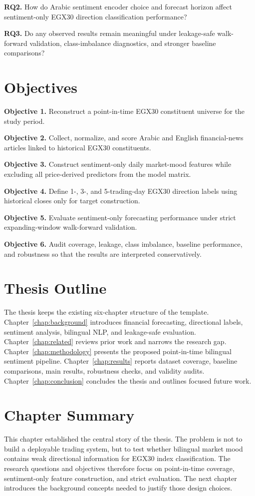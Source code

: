 \noindent\textbf{RQ2.} How do Arabic sentiment encoder choice and forecast horizon affect sentiment-only EGX30 direction classification performance?

\noindent\textbf{RQ3.} Do any observed results remain meaningful under leakage-safe walk-forward validation, class-imbalance diagnostics, and stronger baseline comparisons?

\section{Objectives}

\noindent\textbf{Objective 1.} Reconstruct a point-in-time EGX30 constituent universe for the study period.

\noindent\textbf{Objective 2.} Collect, normalize, and score Arabic and English financial-news articles linked to historical EGX30 constituents.

\noindent\textbf{Objective 3.} Construct sentiment-only daily market-mood features while excluding all price-derived predictors from the model matrix.

\noindent\textbf{Objective 4.} Define 1-, 3-, and 5-trading-day EGX30 direction labels using historical closes only for target construction.

\noindent\textbf{Objective 5.} Evaluate sentiment-only forecasting performance under strict expanding-window walk-forward validation.

\noindent\textbf{Objective 6.} Audit coverage, leakage, class imbalance, baseline performance, and robustness so that the results are interpreted conservatively.

\section{Thesis Outline}

The thesis keeps the existing six-chapter structure of the template. Chapter~\ref{chap:background} introduces financial forecasting, directional labels, sentiment analysis, bilingual NLP, and leakage-safe evaluation. Chapter~\ref{chap:related} reviews prior work and narrows the research gap. Chapter~\ref{chap:methodology} presents the proposed point-in-time bilingual sentiment pipeline. Chapter~\ref{chap:results} reports dataset coverage, baseline comparisons, main results, robustness checks, and validity audits. Chapter~\ref{chap:conclusion} concludes the thesis and outlines focused future work.

\section{Chapter Summary}

This chapter established the central story of the thesis. The problem is not to build a deployable trading system, but to test whether bilingual market mood contains weak directional information for EGX30 index classification. The research questions and objectives therefore focus on point-in-time coverage, sentiment-only feature construction, and strict evaluation. The next chapter introduces the background concepts needed to justify those design choices.
